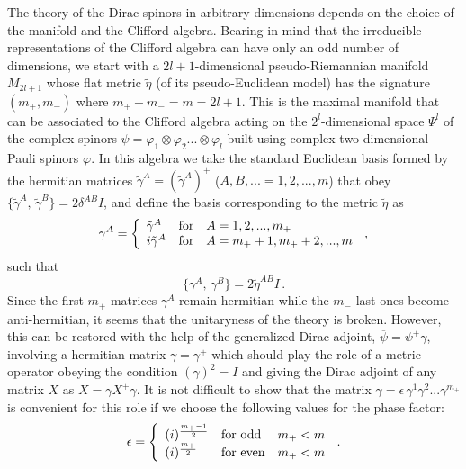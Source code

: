 \documentclass[a4paper,12pt]{article}
\begin{document}
The theory of the Dirac spinors in arbitrary dimensions depends on the choice 
of the manifold and the Clifford algebra. Bearing in mind that the irreducible 
representations of the Clifford algebra can have only an odd number of 
dimensions, we start with a $2l+1$-dimensional pseudo-Riemannian manifold 
$M_{2l+1}$ whose flat metric $\tilde\eta$ (of its pseudo-Euclidean model) has 
the 
signature $( m_{+}, m_{-})$ where $ m_{+} + m_{-}=m=2l+1$. This is the 
maximal manifold that can be associated  to the Clifford algebra  
\cite{Clif} acting on the $2^l$-dimensional space 
$\Psi^{l}$ of the complex spinors $\psi=\varphi_1 \otimes \varphi_2 ...
\otimes\varphi_l$ built using  complex two-dimensional Pauli 
spinors $\varphi$. In this algebra we take the standard Euclidean basis 
formed by the hermitian 
matrices $\tilde\gamma^A= (\tilde\gamma^{A})^{+}$ ($A,B,...=1,2,...,m$) that 
obey  $\{\tilde\gamma^{A},\, \tilde\gamma^{B} \} =2\delta^{A B}I$, and define 
the basis corresponding to the metric $\tilde\eta$ as
\begin{equation}
\gamma^A=\left\{
\begin{array}{lll}
\tilde\gamma^A&{\rm for}& A=1,2,...,  m_{+}\\
i\tilde\gamma^A&{\rm for}& A= m_{+}+1,  m_{+}+2,..., m
\end{array}\right.\,,
\end{equation}
such that
\begin{equation}\label{ACOM}
\{ \gamma^{A},\, \gamma^{B} \} 
=2\tilde\eta^{A B}I\,. 
\end{equation}
Since the first $ m_{+}$ matrices $\gamma^A$ remain hermitian while the 
$ m_{-}$ last ones become anti-hermitian, it seems that the unitaryness 
of the theory is broken. However, this can be restored with the help of the 
generalized  Dirac adjoint,  $\overline{\psi}=\psi^{+}\gamma$, involving a 
hermitian matrix  $\gamma=\gamma^{+}$  which should play the role of a 
metric operator obeying the condition $(\gamma)^2=I$ and giving the Dirac 
adjoint of any matrix $X$ as $\overline{X}=\gamma X^{+} \gamma$. It is not 
difficult to show that the matrix 
$\gamma= \epsilon \,\gamma^{1}\gamma^{2}...\gamma^{m_{+}}$
is convenient for this role \cite{Pro} if we choose the following  values for 
the phase factor:  
\begin{equation}
\epsilon =\left\{
\begin{array}{lll}
(i)^{\frac{{m}_{+}-1}{2}}&{\rm for~ odd}&{m}_{+}<m\\
(i)^{\frac{{m}_{+}}{2}}&{\rm for~ even}&{m}_{+}<m\\
\end{array}\right.\,.
\end{equation}
\end{document}
